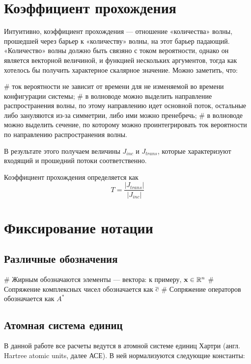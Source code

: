 \section{Коэффициент прохождения}
Интуитивно, коэффициент прохождения — отношение «количества» волны, прошедшей через барьер к «количеству» волны, на этот барьер падающий. «Количество» волны должно быть связяно с током вероятности, однако он является векторной величиной, и функцией нескольких аргументов, тогда как хотелось бы получить характерное скалярное значение. Можно заметить, что:

\begin{easylist}[itemize]
# ток вероятности не зависит от времени для не изменяемой во времени конфигурации системы;
# в волноводе можно выделить направление распространения волны, по этому направлению идет основной поток, остальные либо зануляются из-за симметрии, либо ими можно пренебречь;
# в волноводе можно выделить сечение, по которому можно проинтегрировать ток вероятности по направлению распространения волны.
\end{easylist}

В результате этого получаем величины $J_{inc}$ и $J_{trans}$, которые характеризуют входящий и прошедний потоки соответственно. 

Коэффициент прохождения определяется как
\[
T = \frac{|J_{trans}|}{|J_{inc}|}
\]

\section{Фиксирование нотации}
\subsection{Различные обозначения}

\begin{ilist}
# Жирным обозначаются элементы — вектора: к примеру, $\vb{x} \in \mathbb{R}^n$
# Сопряжение комплексных чисел обозначается как $\overline{c}$
# Сопряжение операторов обозначается как $A^*$
\end{ilist}

\subsection{Атомная система единиц}
В данной работе все расчеты ведутся в атомной системе единиц Хартри (англ. Hartree atomic units, далее АСЕ). В ней нормализуются следующие константы:

